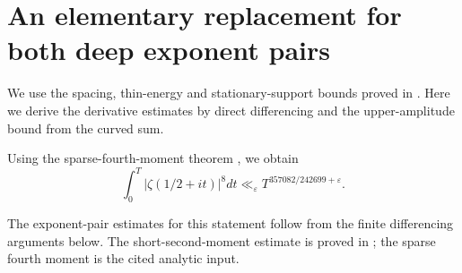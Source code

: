 \section{An elementary replacement for both deep exponent pairs}
\label{app:elementarypair}

We use the spacing, thin-energy and stationary-support bounds proved
in \cite[Sections 2--3]{Thin}. Here we derive the derivative estimates
by direct differencing and the upper-amplitude bound from the curved sum.

\begin{theorem}
\label{thm:elementaryeighth}
Using the sparse-fourth-moment theorem \cite[(\ref*{six-eq:basefourth})]{Weighted}, we obtain
\[
 \int_0^T|\zeta(1/2+it)|^8dt
 \ll_\varepsilon T^{357082/242699+\varepsilon}.
\]
\end{theorem}
The exponent-pair estimates for this statement follow from the
finite differencing arguments below. The short-second-moment estimate
is proved in \cite[Appendix~\ref*{six-app:atkinsondirect}]{Weighted}; the sparse fourth moment
is the cited analytic input.

